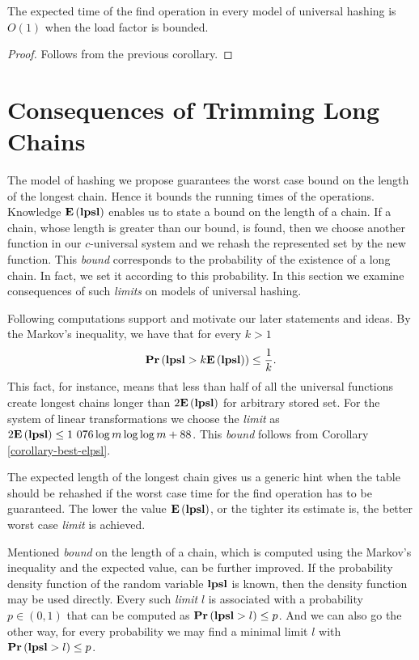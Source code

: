 \begin{corollary}
\label{corollary-find-time}
The expected time of the find operation in every model of universal hashing is $O(1)$ when the load factor is bounded.
\end{corollary}
\begin{proof}
Follows from the previous corollary.
\end{proof}

\section{Consequences of Trimming Long Chains}
The model of hashing we propose guarantees the worst case bound on the length of the longest chain. Hence it bounds the running times of the operations. Knowledge $\mathbf{E}\left(\mathbf{lpsl}\right)$ enables us to state a bound on the length of a chain. If a chain, whose length is greater than our bound, is found, then we choose another function in our $c$-universal system and we rehash the represented set by the new function. This \emph{bound} corresponds to the probability of the existence of a long chain. In fact, we set it according to this probability. In this section we examine consequences of such \emph{limits} on models of universal hashing.

Following computations support and motivate our later statements and ideas. By the Markov's inequality, we have that for every $k > 1$ \[ \mathbf{Pr}\left(\mathbf{lpsl} > k \mathbf{E}\left(\mathbf{lpsl}\right)\right) \leq \frac{1}{k} \text{.} \] This fact, for instance, means that less than half of all the universal functions create longest chains longer than $2 \mathbf{E}\left(\mathbf{lpsl}\right)$ for arbitrary stored set. For the system of linear transformations we choose the \emph{limit} as $2\mathbf{E}\left(\mathbf{lpsl}\right) \leq \text{1 076} \log m \log \log m + 88$. This \emph{bound} follows from Corollary \ref{corollary-best-elpsl}.

The expected length of the longest chain gives us a generic hint when the table should be rehashed if the worst case time for the find operation has to be guaranteed. The lower the value $\mathbf{E}\left(\mathbf{lpsl}\right)$, or the tighter its estimate is, the better worst case \emph{limit} is achieved.

Mentioned \emph{bound} on the length of a chain, which is computed using the Markov's inequality and the expected value, can be further improved. If the probability density function of the random variable $\mathbf{lpsl}$ is known, then the density function may be used directly. Every such \emph{limit} $l$ is associated with a probability $p \in (0, 1)$ that can be computed as $\mathbf{Pr}\left(\mathbf{lpsl} > l\right) \leq p$. And we can also go the other way, for every probability we may find a minimal limit $l$ with $\mathbf{Pr}\left(\mathbf{lpsl} > l\right) \leq p$.

